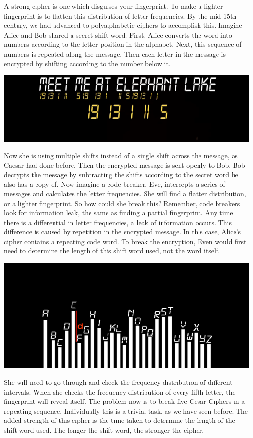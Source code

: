 \documentclass{report}
\begin{document}
A strong cipher is one which disguises your fingerprint. To make a lighter fingerprint is to flatten this distribution of letter frequencies. By the mid-15th century, we had advanced to polyalphabetic ciphers to accomplish this.
Imagine Alice and Bob shared a secret shift word. First, Alice converts the word into numbers according to the letter position in the alphabet. Next, this sequence of numbers is repeated along the message. Then each letter in the message is encrypted by shifting according to the number below it. 
\begin{center}
	\includegraphics[scale=1]{3.png}
\end{center}
Now she is using multiple shifts instead of a single shift across the message, as Caesar had done before. Then the encrypted message is sent openly to Bob. Bob decrypts the message by subtracting the shifts according to the secret word he also has a copy of. 
Now imagine a code breaker, Eve, intercepts a series of messages and calculates the letter frequencies. She will find a flatter distribution, or a lighter fingerprint. So how could she break this? 
Remember, code breakers look for information leak, the same as finding a partial fingerprint. Any time there is a differential in letter frequencies, a leak of information occurs. This difference is caused by repetition in the encrypted message. In this case, Alice's cipher contains a repeating code word. To break the encryption, Even would first need to determine the length of this shift word used, not the word itself.
\begin{center}
	\includegraphics[scale=1]{4.png}
\end{center}
 She will need to go through and check the frequency distribution of different intervals. When she checks the frequency distribution of every fifth letter, the fingerprint will reveal itself. The problem now is to break five Cesar Ciphers in a repeating sequence. Individually this is a trivial task, as we have seen before. The added strength of this cipher is the time taken to determine the length of the shift word used. The longer the shift word, the stronger the cipher.
 
\end{document}
